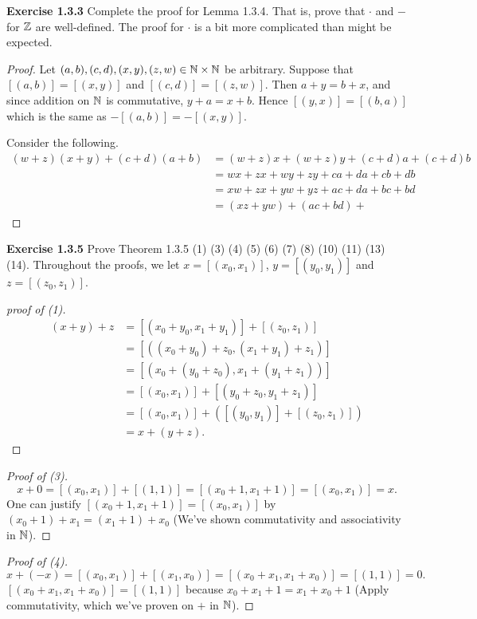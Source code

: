 \newpage

\noindent \textbf{Exercise 1.3.3} Complete the proof for Lemma 1.3.4. That is, prove that \(\cdot\) and \(-\) for \(\mathbb{Z}\) are well-defined. The proof for \(\cdot\) is a bit more complicated
than might be expected.
\begin{proof}
    Let \((a,b), (c,d), (x,y), (z,w) \in \mathbb{N} \times \mathbb{N}\) be arbitrary. Suppose that \([(a,b)] = [(x,y)]\) and \([(c,d)] = [(z,w)]\). Then \(a + y = b+x\), and since addition on \(\mathbb{N}\) is commutative, \(y+a = x+b\).
    Hence \([(y,x)] = [(b,a)]\) which is the same as \(-[(a,b)] = -[(x,y)]\).
    \par Consider the following.
    \begin{align*}
        (w+z)(x+y) + (c+d)(a+b) &= (w+z)x + (w+z)y + (c+d)a + (c+d)b\\
        &= wx + zx + wy + zy + ca + da + cb + db\\
        &= xw + zx + yw + yz + ac + da + bc + bd \\
        &= (xz + yw) + (ac + bd) + 
    \end{align*}
\end{proof}
\noindent \textbf{Exercise 1.3.5} Prove Theorem 1.3.5 (1) (3) (4) (5) (6) (7) (8) (10) (11) (13) (14).
Throughout the proofs, we let \(x = [(x_0, x_1)]\), \(y = [(y_0, y_1)]\) and \(z = [(z_0, z_1)]\).
\begin{proof}[proof of (1)]
    \begin{align*}
        (x+y)+z &= [(x_0 + y_0, x_1 + y_1)] + [(z_0, z_1)]\\
        &= [((x_0 + y_0) + z_0, (x_1 + y_1) + z_1)]\\
        &= [(x_0 + (y_0 + z_0), x_1 + (y_1 + z_1))]\\
        &= [(x_0, x_1)] + [(y_0 + z_0, y_1 + z_1)]\\
        &= [(x_0, x_1)] + ([(y_0, y_1)] + [(z_0, z_1)])\\
        &= x + (y+z).
    \end{align*}
\end{proof}
\begin{proof}[Proof of (3)]
    \[x + 0 = [(x_0, x_1)] + [(1,1)] = [(x_0 + 1, x_1 + 1)] = [(x_0, x_1)] = x.\]
    One can justify \([(x_0+1, x_1 + 1)] = [(x_0, x_1)]\) by \((x_0 + 1) + x_1 = (x_1 + 1) + x_0\) (We've shown commutativity and associativity in \(\mathbb{N}\)).
\end{proof}
\begin{proof}[Proof of (4)]
    \[x + (-x) = [(x_0, x_1)] + [(x_1, x_0)] = [(x_0+x_1, x_1+x_0)] = [(1,1)] = 0.\]
    \([(x_0+x_1, x_1+x_0)] = [(1,1)]\) because \(x_0 + x_1 + 1 = x_1 + x_0 + 1\) (Apply commutativity, which we've proven on \(+\) in \(\mathbb{N}\)).
\end{proof}
